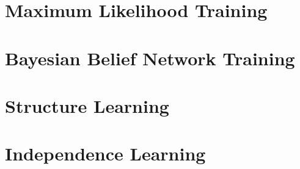 

\section{Maximum Likelihood Training}


 \section{Bayesian Belief Network Training}


\section{Structure Learning}



\section{Independence Learning}

